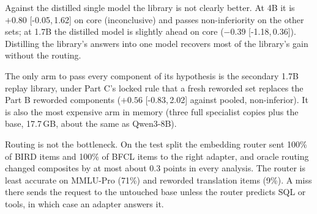 \documentclass[11pt]{article}
\newcommand{\ci}[2]{[#1,\allowbreak\,#2]}
\begin{document}
Against the distilled single model the library is not clearly better. At 4B it is $+0.80$ \ci{-0.05}{1.62} on core
(inconclusive) and passes non-inferiority on the other sets; at 1.7B the distilled model is slightly ahead on core
($-0.39$ \ci{-1.18}{0.36}). Distilling the library's answers into one model recovers most of the library's gain
without the routing.

The only arm to pass every component of its hypothesis is the secondary 1.7B replay library, under Part C's
locked rule that a fresh reworded set replaces the Part B reworded components ($+0.56$ \ci{-0.83}{2.02} against
pooled, non-inferior). It is also the most expensive arm in memory (three full specialist copies plus the base,
17.7\,GB, about the same as Qwen3-8B).

Routing is not the bottleneck. On the test split the embedding router sent 100\% of BIRD items and 100\% of BFCL
items to the right adapter, and oracle routing changed composites by at most about 0.3 points in every analysis. The
router is least accurate on MMLU-Pro (71\%) and reworded translation items (9\%). A miss there sends the request to
the untouched base unless the router predicts SQL or tools, in which case an adapter answers it.
\end{document}

